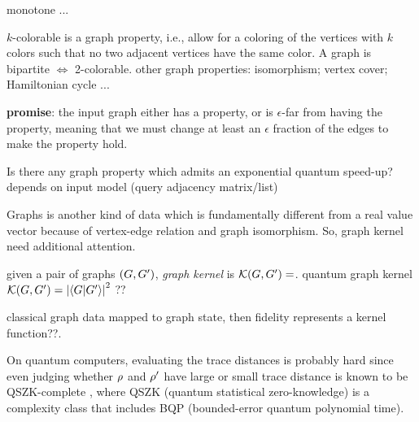 \begin{definition}\label{def:graph_property}
	monotone ...
\end{definition}
\begin{example}[colorable]\label{exm:colorable}
	$k$-colorable is a graph property, i.e., allow for a coloring of the vertices with $k$ colors such that no two adjacent vertices have the same color.
	A graph is bipartite $\iff$ 2-colorable.
	other graph properties: isomorphism; vertex cover; Hamiltonian cycle ...
\end{example}
\begin{problem}\label{prm:graph_property_test}
	\textbf{promise}: the input graph either has a property, or is $\epsilon$-far from having the property, meaning that we must change at least an $\epsilon$ fraction of the edges to make the property hold.
\end{problem}
\begin{theorem}
\end{theorem}
\begin{question}
	\cite{montanaroSurveyQuantumProperty2018}
	Is there any graph property which admits an exponential quantum speed-up?
	\cite{ben-davidSymmetriesGraphProperties2020}
	depends on input model (query adjacency matrix/list)
\end{question}
Graphs is another kind of data which is fundamentally different from a real value vector because of vertex-edge relation and graph isomorphism.
So, graph kernel \cite{kriegeSurveyGraphKernels2020} need additional attention.
\begin{definition}\label{def:graph_kernel}
	given a pair of graphs $(G,G')$,
	\emph{graph kernel} is $\mathcal{K} (G,G')  =$.
	quantum graph kernel $\kernel (\graph,\graph')  = \abs{\ip{\graph}{\graph'}}^2$ ??
	\cite{baiQuantumJensenShannon2015}	
\end{definition}
classical graph data mapped to graph state, then fidelity represents a kernel function??.
\begin{theorem}
	On quantum computers, evaluating the trace distances is probably hard since even judging whether $\rho$ and $\rho'$ have large or small trace distance is known to be QSZK-complete \cite{watrousQuantumComputationalComplexity2008}, where QSZK (quantum statistical zero-knowledge) is a complexity class that includes BQP (bounded-error quantum polynomial time).
\cite{chenVariationalQuantumAlgorithms2022}
\end{theorem}
